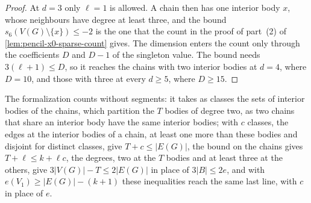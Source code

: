 \begin{proof}
  At $d = 3$ only $\ell = 1$ is allowed. A chain then has one interior
  body $x$, whose neighbours have degree at least three, and the bound
  $s_6(V(G) \setminus \{x\}) \le -2$ is the one that the count in the
  proof of part~(2) of \cref{lem:pencil-x0-sparse-count} gives. The
  dimension enters the count only through the coefficients $D$ and
  $D - 1$ of the singleton value. The bound needs $3(\ell + 1) \le D$,
  so it reaches the chains with two interior bodies at $d = 4$, where
  $D = 10$, and those with three at every $d \ge 5$, where $D \ge 15$.
\end{proof}

\begin{fmlnote}
  The formalization counts without segments: it takes as classes the
  sets of interior bodies of the chains, which partition the $T$ bodies
  of degree two, as two chains that share an interior body have the same
  interior bodies; with $c$ classes, the edges at the interior bodies of
  a chain, at least one more than these bodies and disjoint for distinct
  classes, give $T + c \le |E(G)|$, the bound on the chains gives
  $T + \ell \le k + \ell c$, the degrees, two at the $T$ bodies and at
  least three at the others, give $3|V(G)| - T \le 2|E(G)|$ in place of
  $3|B| \le 2e$, and with $e(V_1) \ge |E(G)| - (k + 1)$ these
  inequalities reach the same last line, with $c$ in place of $e$.
\end{fmlnote}

